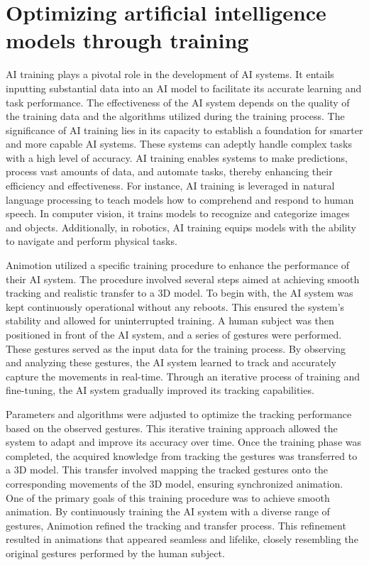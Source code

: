 \section{Optimizing artificial intelligence models through training}
AI training plays a pivotal role in the development of AI systems. It entails inputting substantial data into an AI model to facilitate 
its accurate learning and task performance. The effectiveness of the AI system depends on the quality of the training data 
and the algorithms utilized during the training process.
The significance of AI training lies in its capacity to establish a foundation for smarter and more capable AI systems. 
These systems can adeptly handle complex tasks with a high level of accuracy. AI training enables systems to make predictions, 
process vast amounts of data, and automate tasks, thereby enhancing their efficiency and effectiveness.
For instance, AI training is leveraged in natural language processing to teach models how to comprehend and respond 
to human speech. In computer vision, it trains models to recognize and categorize images and objects. Additionally, 
in robotics, AI training equips models with the ability to navigate and perform physical tasks.\cite{training}

Animotion utilized a specific training procedure to enhance the performance of their AI system. 
The procedure involved several steps aimed at achieving smooth tracking and realistic transfer to a 3D model.
To begin with, the AI system was kept continuously operational without any reboots. 
This ensured the system's stability and allowed for uninterrupted training.
A human subject was then positioned in front of the AI system, and a series of gestures were performed. 
These gestures served as the input data for the training process. By observing and analyzing these gestures, 
the AI system learned to track and accurately capture the movements in real-time.
Through an iterative process of training and fine-tuning, the AI system gradually improved its tracking capabilities.

Parameters and algorithms were adjusted to optimize the tracking performance based on the observed gestures. 
This iterative training approach allowed the system to adapt and improve its accuracy over time.
Once the training phase was completed, the acquired knowledge from tracking the gestures was transferred to a 3D model. 
This transfer involved mapping the tracked gestures onto the corresponding movements of the 3D model, ensuring synchronized animation.
One of the primary goals of this training procedure was to achieve smooth animation. By continuously training the 
AI system with a diverse range of gestures, Animotion refined the tracking and transfer process. 
This refinement resulted in animations that appeared seamless and lifelike, closely resembling the original gestures performed by the human subject.

